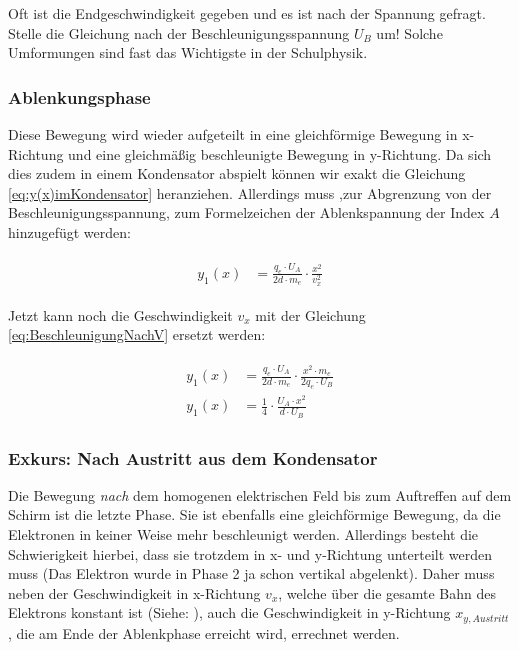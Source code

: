 \begin{Aufgabe}
Oft ist die Endgeschwindigkeit gegeben und es ist nach der Spannung gefragt. Stelle die Gleichung nach der Beschleunigungsspannung $U_B$ um! Solche Umformungen sind fast das Wichtigste in der Schulphysik.
\end{Aufgabe}

\subsubsection{Ablenkungsphase}

Diese Bewegung wird wieder aufgeteilt in eine gleichförmige Bewegung in x-Richtung und eine gleichmäßig beschleunigte Bewegung in y-Richtung. Da sich dies zudem in einem Kondensator abspielt können wir exakt die Gleichung \ref{eq:y(x)imKondensator} heranziehen. Allerdings muss ,zur Abgrenzung von der Beschleunigungsspannung, zum Formelzeichen der Ablenkspannung der Index $A$ hinzugefügt werden:

\begin{align} \label{eq:y_1(x)Braun}
\begin{split}
	y_1(x) &= \frac{q_e \cdot U_A}{2d \cdot m_e} \cdot \frac{x^2}{v_{x}^2}
\end{split}
\end{align}

Jetzt kann noch die Geschwindigkeit $v_{x}$ mit der Gleichung \ref{eq:BeschleunigungNachV} ersetzt werden:

\begin{align} \label{eq:y_1(x)BraunMitV}
\begin{split}
	y_1(x) &= \frac{q_e \cdot U_A}{2d \cdot m_e} \cdot \frac{x^2 \cdot m_e}{2q_e \cdot U_B} \\
	y_1(x) &= \frac{1}{4} \cdot \frac{U_A \cdot x^2}{d \cdot U_B}
\end{split}
\end{align}


\subsubsection{Exkurs: Nach Austritt aus dem Kondensator}

Die Bewegung \emph{nach} dem homogenen elektrischen Feld bis zum Auftreffen auf dem Schirm ist die letzte Phase. Sie ist ebenfalls eine gleichförmige Bewegung, da die Elektronen in keiner Weise mehr beschleunigt werden. Allerdings besteht die Schwierigkeit hierbei, dass sie trotzdem in x- und y-Richtung unterteilt werden muss (Das Elektron wurde in Phase 2 ja schon vertikal abgelenkt). Daher muss neben der Geschwindigkeit in x-Richtung $v_x$, welche über die gesamte Bahn des Elektrons konstant ist (Siehe: ), auch die Geschwindigkeit in y-Richtung $x_{y,Austritt}$, die am Ende der Ablenkphase erreicht wird, errechnet werden. 


